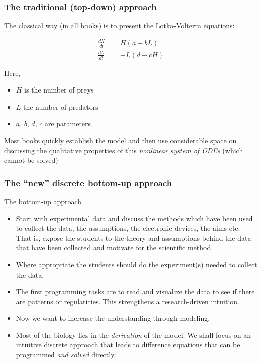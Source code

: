 \documentclass{beamer}
\begin{document}
\begin{frame}
\frametitle{The traditional (top-down) approach}

\begin{block}{}
The classical way (in all books) is to present the Lotka-Volterra equations:

\begin{align*}
\frac{dH}{dt} &= H(a - b L)\\ 
\frac{dL}{dt} &= - L(d - c  H)
\end{align*}

Here,

\begin{itemize}
 \item $H$ is the number of preys

 \item $L$ the number of predators

 \item $a$, $b$, $d$, $c$ are parameters
\end{itemize}

\noindent
Most books quickly establish the model and then use considerable space on
discussing the qualitative properties of this \emph{nonlinear system of
ODEs} (which cannot be solved)
\end{block}
\end{frame}

\begin{frame}
\frametitle{The ``new'' discrete bottom-up approach}

\begin{block}{The bottom-up approach }
\begin{itemize}
\pause
 \item Start with experimental data and discuss the methods which have been used to collect the data, the assumptions, the electronic devices, the aims etc. That is, expose the students to the theory and assumptions behind the data that have been collected and motivate for the scientific method.

\pause
 \item Where appropriate the students should do the experiment(s) needed to collect the data.

\pause
 \item The first programming tasks are to read and visualize the data to see if there are patterns or regularities. This strengthens a research-driven intuition.

\pause
 \item Now we want to increase the understanding through modeling.

\pause
 \item Most of the biology lies in the \emph{derivation} of the model. We shall
   focus on an intuitive discrete approach that leads to difference
   equations that can be programmed \emph{and solved} directly.
\end{itemize}

\noindent
\end{block}
\end{frame}
\end{document}
